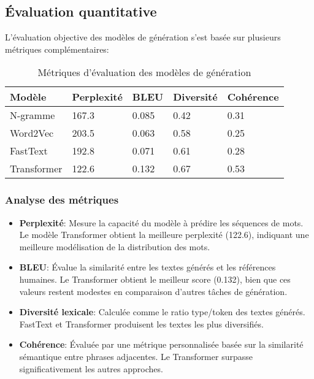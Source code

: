 \documentclass[a4paper,11pt]{article}
\begin{document}
\subsection{Évaluation quantitative}
L'évaluation objective des modèles de génération s'est basée sur plusieurs métriques complémentaires:

\begin{table}[h]
\centering
\begin{tabular}{lllll}
\toprule
\textbf{Modèle} & \textbf{Perplexité} & \textbf{BLEU} & \textbf{Diversité} & \textbf{Cohérence} \\
\midrule
N-gramme & 167.3 & 0.085 & 0.42 & 0.31 \\
Word2Vec & 203.5 & 0.063 & 0.58 & 0.25 \\
FastText & 192.8 & 0.071 & 0.61 & 0.28 \\
Transformer & 122.6 & 0.132 & 0.67 & 0.53 \\
\bottomrule
\end{tabular}
\caption{Métriques d'évaluation des modèles de génération}
\label{tab:generation-metrics}
\end{table}

\subsubsection{Analyse des métriques}
\begin{itemize}
    \item \textbf{Perplexité}: Mesure la capacité du modèle à prédire les séquences de mots. Le modèle Transformer obtient la meilleure perplexité (122.6), indiquant une meilleure modélisation de la distribution des mots.
    
    \item \textbf{BLEU}: Évalue la similarité entre les textes générés et les références humaines. Le Transformer obtient le meilleur score (0.132), bien que ces valeurs restent modestes en comparaison d'autres tâches de génération.
    
    \item \textbf{Diversité lexicale}: Calculée comme le ratio type/token des textes générés. FastText et Transformer produisent les textes les plus diversifiés.
    
    \item \textbf{Cohérence}: Évaluée par une métrique personnalisée basée sur la similarité sémantique entre phrases adjacentes. Le Transformer surpasse significativement les autres approches.
\end{itemize}
\end{document}
